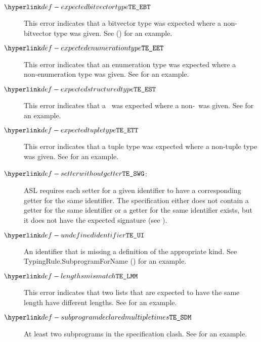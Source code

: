 \begin{description}
\hypertarget{def-expectedbitvectortype}{}
\item[$\ExpectedBitvectorType$]
This error indicates that a bitvector type was expected where a non-bitvector type was given.
See  () for an example.

\hypertarget{def-expectedenumerationtype}{}
\item[$\ExpectedEnumerationType$]
This error indicates that an enumeration type was expected where a \\
non-enumeration type was given.
See  for an example.

\hypertarget{def-expectedstructuredtype}{}
\item[$\ExpectedStructuredType$]
This error indicates that a \structuredtype\ was expected where a non-\structuredtype\ was given.
See  for an example.

\hypertarget{def-expectedtupletype}{}
\item[$\ExpectedTupleType$]
This error indicates that a tuple type was expected where a non-tuple type was given.
See  for an example.

\hypertarget{def-setterwithoutgetter}{}
\item[$\SetterWithoutGetter$:]
ASL requires each setter for a given identifier to have a corresponding getter for the same
identifier.
The specification either does not contain a getter for the same identifier
or a getter for the same identifier exists, but it does not have the expected
signature (see ).

\hypertarget{def-undefinedidentifier}{}
\item[$\UndefinedIdentifier$]
An identifier that is missing a definition of the appropriate kind.
See TypingRule.SubprogramForName () for an example.

\hypertarget{def-lengthsmismatch}{}
\item[$\LengthsMismatch$]
This error indicates that two lists that are expected to have the same length have different lengths.
See  for an example.

\hypertarget{def-subprogramdeclaredmultipletimes}{}
\item[$\SubrogramDeclaredMultipleTimes$]
At least two subprograms in the specification clash.
See  for an example.


\end{description}

